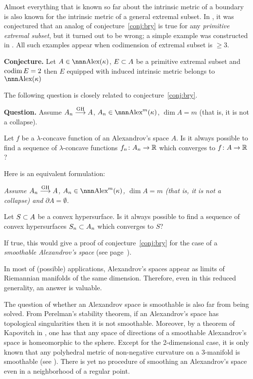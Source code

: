 \documentclass{article}
\begin{document}
Almost everything that is known so far about the intrinsic metric of a boundary is also known for the intrinsic metric of a general extremal subset.
In \cite{perelman-petrunin:extremal}, it was conjectured  that an analog of conjecture~\ref{conj:bry} is true for any \emph{primitive extremal subset}, but it turned out to be wrong; a simple example was constructed in \cite{petrunin:extremal}. 
All such examples appear when codimension of extremal subset is $\ge 3$.

\begin{thm}{\bf Conjecture.}\label{conj:codim=2}
Let $A\in\Alex(\kappa)$, $E\subset A$ be a primitive extremal subset and $\operatorname{codim}
E=2$ then $E$ equipped with induced intrinsic metric belongs to  $\Alex(\kappa)$
\end{thm}

The following question is closely related to conjecture~\ref{conj:bry}.

\begin{thm}{\bf Question.}\label{qst:lift-conc}
Assume $A_n\GHto A$, $A_n\in \Alex^m(\kappa)$, $\dim A=m$ (that is, 
it is not a collapse).

Let $f$ be a $\lambda$-concave function of an Alexandrov's space $A$. 
Is it always possible to find a sequence of $\lambda$-concave functions
$f_n\colon A_n\to \mathbb{R}$ which converges to $f\colon A\to\mathbb{R}$? 
\end{thm}

Here is an equivalent formulation:

\bigskip

 {\it Assume $A_n\GHto A$, $A_n\in \Alex^m(\kappa)$, $\dim
A=m$ (that is, it is not a collapse) and $\partial A=\emptyset$.

Let $S\subset A$ be a convex hypersurface. 
Is it always possible to find a sequence of convex hypersurfaces $S_n\subset A_n$
which converges to $S$?
}

\bigskip

If true, this would give a proof of  conjecture~\ref{conj:bry} for the
case of a \emph{smoothable Alexandrov's space} (see page~\pageref{smoothable}).

In most of (possible) applications, Alexandrov's spaces appear as
limits of Riemannian manifolds of the same dimension.
Therefore, even in this reduced generality, 
an answer is valuable.

The question of whether an Alexandrov space is smoothable is also far from being solved.
From Perelman’s stability theorem, if an Alexandrov's space has topological singularities then it is not smoothable.
Moreover, by a theorem of Kapovitch in \cite{kapovitch:regularity},
one has that any space of
directions of a smoothable Alexandrov's space is homeomorphic to the sphere. 
Except for the 2-dimensional case, it is only known that any polyhedral metric of non-negative curvature on a 3-manifold is smoothable (see \cite{matveev:smooth}).
There is yet no procedure of smoothing an Alexandrov's space even in a neighborhood of a regular point.
\end{document}
